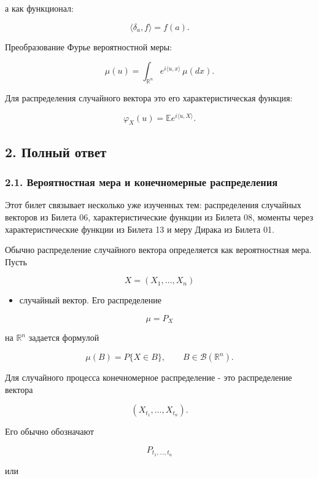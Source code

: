 \documentclass[
  11pt,
  a4paper,
]{article}
\providecommand{\tightlist}{%
  \setlength{\itemsep}{0pt}\setlength{\parskip}{0pt}}
\begin{document}
а как функционал:

\[
\langle\delta_a,f\rangle=f(a).
\]

Преобразование Фурье вероятностной меры:

\[
\widehat\mu(u)
=
\int_{\mathbb R^n} e^{i\langle u,x\rangle}\,\mu(dx).
\]

Для распределения случайного вектора это его характеристическая функция:

\[
\varphi_X(u)=\mathbb E e^{i\langle u,X\rangle}.
\]

\subsection{2. Полный
ответ}\label{ux43fux43eux43bux43dux44bux439-ux43eux442ux432ux435ux442}

\subsubsection{2.1. Вероятностная мера и конечномерные
распределения}\label{ux432ux435ux440ux43eux44fux442ux43dux43eux441ux442ux43dux430ux44f-ux43cux435ux440ux430-ux438-ux43aux43eux43dux435ux447ux43dux43eux43cux435ux440ux43dux44bux435-ux440ux430ux441ux43fux440ux435ux434ux435ux43bux435ux43dux438ux44f}

Этот билет связывает несколько уже изученных тем: распределения
случайных векторов из Билета 06, характеристические функции из Билета
08, моменты через характеристические функции из Билета 13 и меру Дирака
из Билета 01.

Обычно распределение случайного вектора определяется как вероятностная
мера. Пусть

\[
X=(X_1,\ldots,X_n)
\]

\begin{itemize}
\tightlist
\item
  случайный вектор. Его распределение
\end{itemize}

\[
\mu=P_X
\]

на \(\mathbb R^n\) задается формулой

\[
\mu(B)=P\{X\in B\},
\qquad
B\in\mathcal B(\mathbb R^n).
\]

Для случайного процесса конечномерное распределение - это распределение
вектора

\[
(X_{t_1},\ldots,X_{t_n}).
\]

Его обычно обозначают

\[
P_{t_1,\ldots,t_n}
\]

или
\end{document}
